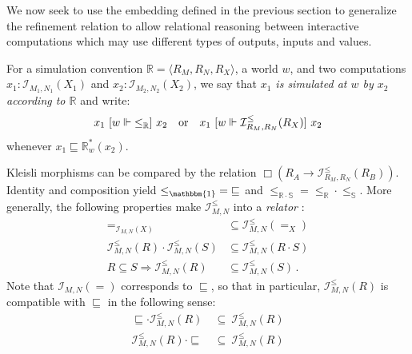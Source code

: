 We now seek to use the embedding defined in the previous section
to generalize the refinement relation
to allow relational reasoning between interactive computations
which may use different types of outputs, inputs and values.

\begin{definition}
For a simulation convention $\mathbb{R} = \langle R_M, R_N, R_X \rangle$,
a world $w$,
and two computations
$x_1 : \mathcal{I}_{M_1, N_1}(X_1)$ and
$x_2 : \mathcal{I}_{M_2, N_2}(X_2)$,
we say that
\emph{$x_1$ is simulated at $w$ by $x_2$ according to $\mathbb{R}$}
and write:
\[
    x_1 \ [{w \Vdash {\le}_\mathbb{R}}]\  x_2
    \quad \mbox{or} \quad
    x_1 \ [{w \Vdash \mathcal{I}^\le_{R_M,R_N}(R_X)}]\  x_2
\]
whenever $x_1 \sqsubseteq \mathbb{R}^*_w(x_2)$.
\end{definition}

Kleisli morphisms can be compared
by the relation $\Box(R_A \rightarrow \mathcal{I}^\le_{R_M,R_N}(R_B))$.
Identity and composition yield
${\le}_\mathbbm{1} = {\sqsubseteq}$ and
${\le}_{\mathbb{R} \cdot \mathbb{S}} =
 {\le}_\mathbb{R} \cdot {\le}_\mathbb{S}$.
More generally,
the following properties make
$\mathcal{I}_{M,N}^\le$ into a \emph{relator} \cite{something}:
\begin{align*}
  {=}_{\mathcal{I}_{M,N}(X)} &\subseteq \mathcal{I}_{M,N}^\le(=_X) \\
  \mathcal{I}_{M,N}^\le(R) \cdot \mathcal{I}_{M,N}^\le(S) &\subseteq
    \mathcal{I}_{M,N}^\le(R \cdot S) \\
  R \subseteq S \Rightarrow
    \mathcal{I}_{M,N}^\le(R) &\subseteq \mathcal{I}_{M,N}^\le(S) \,.
\end{align*}
Note that $\mathcal{I}_{M,N}(=)$ corresponds to $\sqsubseteq$,
so that in particular, $\mathcal{I}_{M,N}^\le(R)$ is compatible with $\sqsubseteq$
in the following sense:
\begin{align*}
    {\sqsubseteq} \cdot \mathcal{I}_{M,N}^\le(R) &\:\subseteq\:
      \mathcal{I}_{M,N}^\le(R) \\
    \mathcal{I}_{M,N}^\le(R) \cdot {\sqsubseteq} &\:\subseteq\:
      \mathcal{I}_{M,N}^\le(R)
\end{align*}

